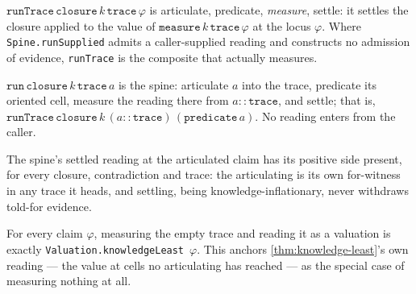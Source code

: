 \begin{definition}\label{thm:spine-runtrace}\leanok{}
\(\texttt{runTrace}\,\texttt{closure}\,k\,\texttt{trace}\,\varphi\) is
articulate, predicate, \emph{measure}, settle: it settles the closure applied
to the value of \(\texttt{measure}\,k\,\texttt{trace}\,\varphi\) at the locus
\(\varphi\). Where \texttt{Spine.runSupplied} admits a caller-supplied
reading and constructs no admission of evidence, \texttt{runTrace} is the
composite that actually measures.
\end{definition}
\begin{definition}\label{thm:spine-run}\leanok{}
\(\texttt{run}\,\texttt{closure}\,k\,\texttt{trace}\,a\) is the spine:
articulate \(a\) into the trace, predicate its oriented cell, measure the
reading there from \(a :: \texttt{trace}\), and settle; that is,
\(\texttt{runTrace}\,\texttt{closure}\,k\,(a :: \texttt{trace})\,(\texttt{predicate}\,a)\).
No reading enters from the caller.
\end{definition}
\begin{theorem}\label{thm:spine-run-pos}\leanok{}
The spine's settled reading at the articulated claim has its positive side
present, for every closure, contradiction and trace: the articulating is its
own for-witness in any trace it heads, and settling, being knowledge-inflationary,
never withdraws told-for evidence.
\end{theorem}

\begin{theorem}\label{thm:spine-measure-nil-knowledgeleast}\leanok{}
For every claim \(\varphi\), measuring the empty trace and reading it as a
valuation is exactly \texttt{Valuation.knowledgeLeast}~\(\varphi\). This
anchors \cref{thm:knowledge-least}'s own reading --- the value at cells no
articulating has reached --- as the special case of measuring nothing at all.
\end{theorem}


